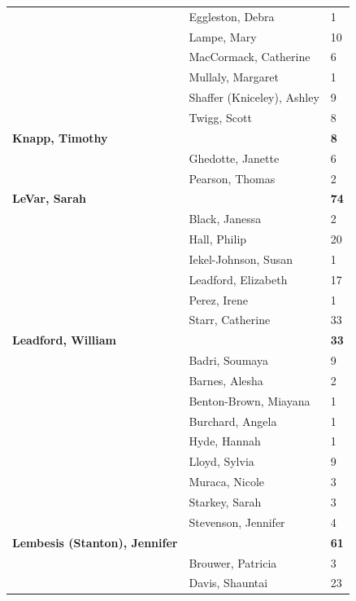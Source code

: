 \documentclass{article}\usepackage[]{graphicx}\usepackage[]{color}
\begin{document}
{\begin{longtable} { >{\raggedright}p{}|p{}p{}}
   & Eggleston, Debra & 1 \\ 
   \rowcolor[gray]{0.90} & Lampe, Mary & 10 \\ 
   \rowcolor[gray]{0.90} & MacCormack, Catherine & 6 \\ 
   \rowcolor[gray]{0.90} & Mullaly, Margaret & 1 \\ 
   & Shaffer (Kniceley), Ashley & 9 \\ 
   & Twigg, Scott & 8 \\ 
  \textbf{Knapp, Timothy} &  & \hspace{2cm}\textbf{8} \\ 
   \rowcolor[gray]{0.90} & Ghedotte, Janette & 6 \\ 
   \rowcolor[gray]{0.90} & Pearson, Thomas & 2 \\ 
   \rowcolor[gray]{0.90}\textbf{LeVar, Sarah} &  & \hspace{2cm}\textbf{74} \\ 
   & Black, Janessa & 2 \\ 
   & Hall, Philip & 20 \\ 
   & Iekel-Johnson, Susan & 1 \\ 
   \rowcolor[gray]{0.90} & Leadford, Elizabeth & 17 \\ 
   \rowcolor[gray]{0.90} & Perez, Irene & 1 \\ 
   \rowcolor[gray]{0.90} & Starr, Catherine & 33 \\ 
  \textbf{Leadford, William} &  & \hspace{2cm}\textbf{33} \\ 
   & Badri, Soumaya & 9 \\ 
   & Barnes, Alesha & 2 \\ 
   \rowcolor[gray]{0.90} & Benton-Brown, Miayana & 1 \\ 
   \rowcolor[gray]{0.90} & Burchard, Angela & 1 \\ 
   \rowcolor[gray]{0.90} & Hyde, Hannah & 1 \\ 
   & Lloyd, Sylvia & 9 \\ 
   & Muraca, Nicole & 3 \\ 
   & Starkey, Sarah & 3 \\ 
   \rowcolor[gray]{0.90} & Stevenson, Jennifer & 4 \\ 
   \rowcolor[gray]{0.90}\textbf{Lembesis (Stanton), Jennifer} &  & \hspace{2cm}\textbf{61} \\ 
   \rowcolor[gray]{0.90} & Brouwer, Patricia & 3 \\ 
   & Davis, Shauntai & 23 \\ 

\end{longtable}}
\end{document}

